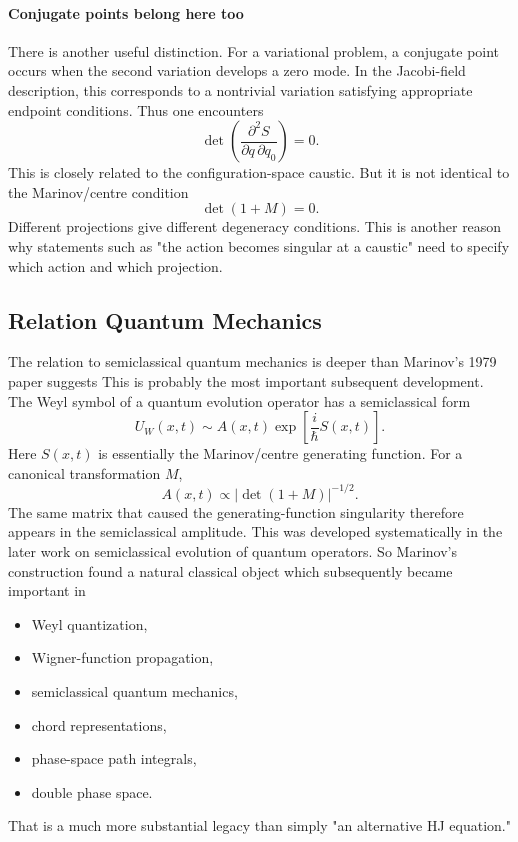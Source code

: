 \paragraph{ Conjugate points belong here too}
There is another useful distinction.
For a variational problem, a conjugate point occurs when the second variation
develops a zero mode.
In the Jacobi-field description, this corresponds to a nontrivial variation
satisfying appropriate endpoint conditions.
Thus one encounters
$$ \det\left( \frac{\partial^2 S}{\partial q\,\partial q_0} \right)=0. $$
This is closely related to the configuration-space caustic.
But it is not identical to the Marinov/centre condition
$$ \det(1+M)=0. $$
Different projections give different degeneracy conditions.
This is another reason why statements such as "the action becomes singular at a
caustic" need to specify which action and which projection.

\subsection{Relation  Quantum Mechanics}
 The relation to semiclassical quantum mechanics is deeper than Marinov's 1979
 paper suggests
This is probably the most important subsequent development.
The Weyl symbol of a quantum evolution operator has a semiclassical form
$$ U_W(x,t) \sim A(x,t) \exp\left[\frac{i}{\hbar}S(x,t)\right]. $$
Here \(S(x,t)\) is essentially the Marinov/centre generating function.
For a canonical transformation \(M\),
$$ A(x,t) \propto |\det(1+M)|^{-1/2}. $$
The same matrix that caused the generating-function singularity therefore
appears in the semiclassical amplitude.
This was developed systematically in the later work on semiclassical evolution
of quantum operators.
So Marinov's construction found a natural classical object which subsequently
became important in
\begin{itemize}
   \item Weyl quantization,
   \item Wigner-function propagation,
   \item semiclassical quantum mechanics,
   \item chord representations,
   \item phase-space path integrals,
   \item double phase space.
\end{itemize}
That is a much more substantial legacy than simply "an alternative HJ equation."

